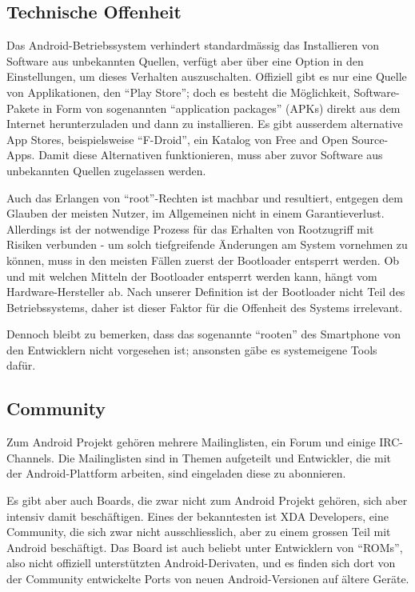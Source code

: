 \subsection{Technische Offenheit}
Das Android-Betriebssystem verhindert standardmässig das Installieren von Software aus unbekannten Quellen, verfügt aber über eine Option in den Einstellungen, um dieses Verhalten auszuschalten. Offiziell gibt es nur eine Quelle von Applikationen, den ``Play Store''; doch es besteht die Möglichkeit, Software-Pakete in Form von sogenannten ``application packages'' (APKs) direkt aus dem Internet herunterzuladen und dann zu installieren. Es gibt ausserdem alternative App Stores, beispielsweise ``F-Droid'', ein Katalog von Free and Open Source-Apps\thinspace\cite{online:f-droid}. Damit diese Alternativen funktionieren, muss aber zuvor Software aus unbekannten Quellen zugelassen werden.

Auch das Erlangen von ``root''-Rechten ist machbar und resultiert, entgegen dem Glauben der meisten Nutzer, im Allgemeinen nicht in einem Garantieverlust\thinspace\cite{online:xda-rooting-warranty}. Allerdings ist der notwendige Prozess für das Erhalten von Rootzugriff mit Risiken verbunden - um solch tiefgreifende Änderungen am System vornehmen zu können, muss in den meisten Fällen zuerst der Bootloader entsperrt werden. 
Ob und mit welchen Mitteln der Bootloader entsperrt werden kann, hängt vom Hardware-Hersteller ab\thinspace\cite{online:apu-what-is-unlocking}. Nach unserer Definition ist der Bootloader nicht Teil des Betriebssystems, daher ist dieser Faktor für die Offenheit des Systems irrelevant.

Dennoch bleibt zu bemerken, dass das sogenannte ``rooten'' des Smartphone von den Entwicklern nicht vorgesehen ist; ansonsten gäbe es systemeigene Tools dafür.\\

\subsection{Community}
Zum Android Projekt gehören mehrere Mailinglisten, ein Forum und einige IRC-Channels\thinspace\cite{online:android-community}. Die Mailinglisten sind in Themen aufgeteilt und Entwickler, die mit der Android-Plattform arbeiten, sind eingeladen diese zu abonnieren\thinspace\cite{online:android-community}.

Es gibt aber auch Boards, die zwar nicht zum Android Projekt gehören, sich aber intensiv damit beschäftigen. Eines der bekanntesten ist XDA Developers\thinspace\cite{online:xda-developers}, eine Community, die sich zwar nicht ausschliesslich, aber zu einem grossen Teil mit Android beschäftigt. Das Board ist auch beliebt unter Entwicklern von ``ROMs'', also nicht offiziell unterstützten Android-Derivaten, und es finden sich dort von der Community entwickelte Ports von neuen Android-Versionen auf ältere Geräte.\\

